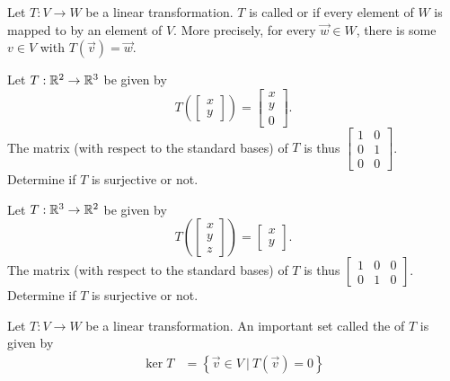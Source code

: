 \begin{applicationActivities}{2}{18}
\begin{definition}
Let $T: V \rightarrow W$ be a linear transformation.
$T$ is called  or  if every element of $W$ is mapped to by an element of $V$.  More precisely, for every $\vec{w} \in W$, there is some $v \in V$ with $T(\vec{v})=\vec{w}$.
\end{definition}

\begin{activity}{5}
Let $T: \mathbb{R}^2 \rightarrow \mathbb{R}^3$ be given by $$T\left(\begin{bmatrix}x \\ y \end{bmatrix} \right) = \begin{bmatrix} x \\ y \\ 0 \end{bmatrix}.$$
The matrix (with respect to the standard bases) of $T$ is thus $\begin{bmatrix} 1 & 0 \\ 0 & 1 \\ 0 & 0 \end{bmatrix}$. \\
Determine if $T$ is surjective or not.
\end{activity}

\begin{activity}{5}
Let $T: \mathbb{R}^3 \rightarrow \mathbb{R}^2$ be given by $$T\left(\begin{bmatrix} x \\ y \\ z \end{bmatrix} \right) = \begin{bmatrix} x \\ y \end{bmatrix}.$$  The matrix (with respect to the standard bases) of $T$ is thus $\begin{bmatrix} 1 & 0 &0  \\ 0 & 1 & 0 \end{bmatrix}$.\\
Determine if $T$ is surjective or not.
\end{activity}


\begin{definition}
Let $T: V \rightarrow W$ be a linear transformation.  An important set called the  of $T$ is given by
\begin{align*}
\ker T &= \left\{ \vec{v} \in V\ \big|\ T(\vec{v})=0\right\} \\
\end{align*}


\end{definition}
\end{applicationActivities}
